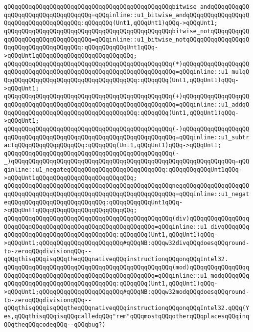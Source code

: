 \verb|qQQqqQQqqQQqqQQqqQQqqQQqqQQqqQQqqQQqqQQqqQQqqQQqbitwise_andqQQqqQQqqQQqqQQqqQQqqQQqqQQqqQQqqQQq=qQQqinline::u1_bitwise_andqQQqqQQqqQQqqQQqqQQqqQQqqQQqqQQqqQQqqQQq:qQQqqQQq(Unt1,qQQqUnt1)qQQq->qQQqUnt1;|\newline
\verb|qQQqqQQqqQQqqQQqqQQqqQQqqQQqqQQqqQQqqQQqqQQqqQQqbitwise_notqQQqqQQqqQQqqQQqqQQqqQQqqQQqqQQqqQQq=qQQqinline::u1_bitwise_notqQQqqQQqqQQqqQQqqQQqqQQqqQQqqQQqqQQqqQQq:qQQqqQQqqQQqUnt1qQQq->qQQqUnt1qQQqqQQqqQQqqQQqqQQqqQQqqQQq;|\newline
\verb|qQQqqQQqqQQqqQQqqQQqqQQqqQQqqQQqqQQqqQQqqQQqqQQq(*)qQQqqQQqqQQqqQQqqQQqqQQqqQQqqQQqqQQqqQQqqQQqqQQqqQQqqQQqqQQqqQQqqQQq=qQQqinline::u1_mulqQQqqQQqqQQqqQQqqQQqqQQqqQQqqQQqqQQqqQQq:qQQqqQQq(Unt1,qQQqUnt1)qQQq->qQQqUnt1;|\newline
\verb|qQQqqQQqqQQqqQQqqQQqqQQqqQQqqQQqqQQqqQQqqQQqqQQq(+)qQQqqQQqqQQqqQQqqQQqqQQqqQQqqQQqqQQqqQQqqQQqqQQqqQQqqQQqqQQqqQQqqQQq=qQQqinline::u1_addqQQqqQQqqQQqqQQqqQQqqQQqqQQqqQQqqQQqqQQq:qQQqqQQq(Unt1,qQQqUnt1)qQQq->qQQqUnt1;|\newline
\verb|qQQqqQQqqQQqqQQqqQQqqQQqqQQqqQQqqQQqqQQqqQQqqQQq(-)qQQqqQQqqQQqqQQqqQQqqQQqqQQqqQQqqQQqqQQqqQQqqQQqqQQqqQQqqQQqqQQqqQQq=qQQqinline::u1_subtractqQQqqQQqqQQqqQQqqQQq:qQQqqQQq(Unt1,qQQqUnt1)qQQq->qQQqUnt1;|\newline
\verb|qQQqqQQqqQQqqQQqqQQqqQQqqQQqqQQqqQQqqQQqqQQqqQQq(-_)qQQqqQQqqQQqqQQqqQQqqQQqqQQqqQQqqQQqqQQqqQQqqQQqqQQqqQQqqQQqqQQq=qQQqinline::u1_negateqQQqqQQqqQQqqQQqqQQqqQQqqQQq:qQQqqQQqqQQqUnt1qQQq->qQQqUnt1qQQqqQQqqQQqqQQqqQQqqQQqqQQq;|\newline
\verb|qQQqqQQqqQQqqQQqqQQqqQQqqQQqqQQqqQQqqQQqqQQqqQQqnegqQQqqQQqqQQqqQQqqQQqqQQqqQQqqQQqqQQqqQQqqQQqqQQqqQQqqQQqqQQqqQQqqQQq=qQQqinline::u1_negateqQQqqQQqqQQqqQQqqQQqqQQqqQQq:qQQqqQQqqQQqUnt1qQQq->qQQqUnt1qQQqqQQqqQQqqQQqqQQqqQQqqQQq;|\newline
\verb|qQQqqQQqqQQqqQQqqQQqqQQqqQQqqQQqqQQqqQQqqQQqqQQq(div)qQQqqQQqqQQqqQQqqQQqqQQqqQQqqQQqqQQqqQQqqQQqqQQqqQQqqQQqqQQq=qQQqinline::u1_divqQQqqQQqqQQqqQQqqQQqqQQqqQQqqQQqqQQqqQQq:qQQqqQQq(Unt1,qQQqUnt1)qQQq->qQQqUnt1;qQQqqQQqqQQqqQQqqQQqqQQq#qQQqNB:qQQqw32divqQQqdoesqQQqround-to-zeroqQQqdivisionqQQq--qQQqthisqQQqisqQQqtheqQQqnativeqQQqinstructionqQQqonqQQqIntel32.|\newline
\verb|qQQqqQQqqQQqqQQqqQQqqQQqqQQqqQQqqQQqqQQqqQQqqQQq(mod)qQQqqQQqqQQqqQQqqQQqqQQqqQQqqQQqqQQqqQQqqQQqqQQqqQQqqQQqqQQq=qQQqinline::u1_modqQQqqQQqqQQqqQQqqQQqqQQqqQQqqQQqqQQqqQQq:qQQqqQQq(Unt1,qQQqUnt1)qQQq->qQQqUnt1;qQQqqQQqqQQqqQQqqQQqqQQq#qQQqNB:qQQqw32modqQQqdoesqQQqround-to-zeroqQQqdivisionqQQq--qQQqthisqQQqisqQQqtheqQQqnativeqQQqinstructionqQQqonqQQqIntel32.qQQq(Yes,qQQqthisqQQqisqQQqcalledqQQq"rem"qQQqmostqQQqotherqQQqplacesqQQqinqQQqtheqQQqcodeqQQq--qQQqbug?)|\newline
